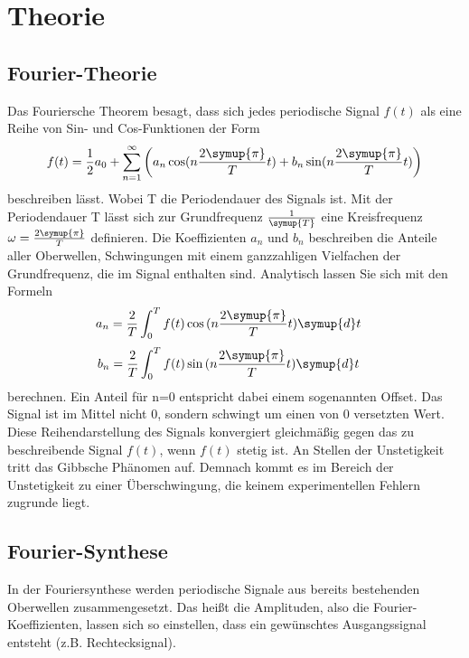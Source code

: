 \section{Theorie}
\label{sec:Theorie}
\subsection{Fourier-Theorie}
Das Fouriersche Theorem besagt, dass sich jedes periodische Signal $f(t)$ als
eine Reihe von Sin- und Cos-Funktionen der Form
\begin{equation}
  \label{eqn:Fourier-Reihe}
  f(t)=\frac{1}{2}a_0+\sum_{n=1}^{\infty}\left(a_n \cos(n\frac{2\symup{\pi}}{T}t)+b_n \sin(n\frac{2\symup{\pi}}{T}t)\right)
\end{equation}
beschreiben lässt. Wobei T die Periodendauer des Signals ist.
Mit der Periodendauer T lässt sich zur Grundfrequenz $\frac{1}{\symup{T}}$ eine Kreisfrequenz $\omega=\frac{2\symup{\pi}}{T}$
definieren. Die Koeffizienten $a_n$ und $b_n$ beschreiben die Anteile aller
Oberwellen, Schwingungen mit einem ganzzahligen Vielfachen der Grundfrequenz,
die im Signal enthalten sind. Analytisch lassen Sie sich mit den Formeln
\begin{align}
  a_n & =\frac{2}{T}\int_0^Tf(t)\cos{(n\frac{2\symup{\pi}}{T}t)}\symup{d}t
  \label{eqn:an}
\end{align}
\begin{align}
  b_n & =\frac{2}{T}\int_0^{T}f(t)\sin{(n\frac{2\symup{\pi}}{T}t)}\symup{d}t
  \label{eqn:bn}
\end{align}
berechnen. Ein Anteil für n=0 entspricht dabei einem sogenannten Offset.
Das Signal ist im Mittel nicht 0, sondern schwingt um einen von 0
versetzten Wert.\\

\noindent Diese Reihendarstellung des Signals konvergiert gleichmäßig
gegen das zu beschreibende Signal $f(t)$, wenn $f(t)$ stetig ist. An Stellen der Unstetigkeit
tritt das Gibbsche Phänomen auf. Demnach kommt es im Bereich der Unstetigkeit zu einer
Überschwingung, die keinem experimentellen Fehlern zugrunde liegt.
\cite{V351}
\subsection{Fourier-Synthese}
In der Fouriersynthese werden periodische Signale aus bereits bestehenden
Oberwellen zusammengesetzt. Das heißt die Amplituden, also die
Fourier-Koeffizienten, lassen sich so einstellen, dass ein gewünschtes
Ausgangssignal entsteht (z.B. Rechtecksignal). \cite{V351}
